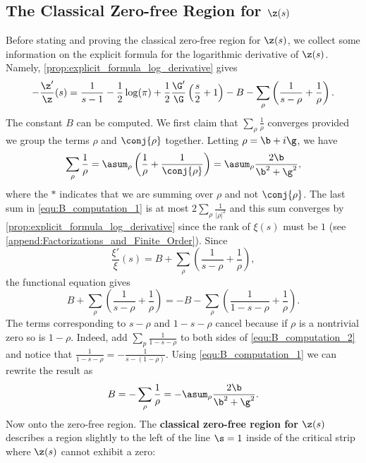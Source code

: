     \subsection*{The Classical Zero-free Region for \texorpdfstring{$\z(s)$}{\z(s)}}
      Before stating and proving the classical zero-free region for $\z(s)$, we collect some information on the explicit formula for the logarithmic derivative of $\z(s)$. Namely, \cref{prop:explicit_formula_log_derivative} gives
      \begin{equation}\label{equ:explicit_log_derivative_zeta}
        -\frac{\z'}{\z}(s) = \frac{1}{s-1}-\frac{1}{2}\log(\pi)+\frac{1}{2}\frac{\G'}{\G}\left(\frac{s}{2}+1\right)-B-\sum_{\rho}\left(\frac{1}{s-\rho}+\frac{1}{\rho}\right).
      \end{equation}
      The constant $B$ can be computed. We first claim that $\sum_{\rho}\frac{1}{\rho}$ converges provided we group the terms $\rho$ and $\conj{\rho}$ together. Letting $\rho = \b+i\g$, we have
      \begin{equation}\label{equ:B_computation_1}
        \sum_{\rho}\frac{1}{\rho} = \asum_{\rho}\left(\frac{1}{\rho}+\frac{1}{\conj{\rho}}\right) = \asum_{\rho}\frac{2\b}{\b^{2}+\g^{2}},
      \end{equation}
      where the $\ast$ indicates that we are summing over $\rho$ and not $\conj{\rho}$. The last sum in \cref{equ:B_computation_1} is at most $2\sum_{\rho}\frac{1}{|\rho|^{2}}$ and this sum converges by \cref{prop:explicit_formula_log_derivative} since the rank of $\xi(s)$ must be $1$ (see \cref{append:Factorizations_and_Finite_Order}). Since
      \[
        \frac{\xi'}{\xi}(s) = B+\sum_{\rho}\left(\frac{1}{s-\rho}+\frac{1}{\rho}\right),
      \]
      the functional equation gives
      \begin{equation}\label{equ:B_computation_2}
        B+\sum_{\rho}\left(\frac{1}{s-\rho}+\frac{1}{\rho}\right) = -B-\sum_{\rho}\left(\frac{1}{1-s-\rho}+\frac{1}{\rho}\right).
      \end{equation}
      The terms corresponding to $s-\rho$ and $1-s-\rho$ cancel because if $\rho$ is a nontrivial zero so is $1-\rho$. Indeed, add $\sum_{p}\frac{1}{1-s-\rho}$ to both sides of \cref{equ:B_computation_2} and notice that $\frac{1}{1-s-\rho} = -\frac{1}{s-(1-\rho)}$. Using \cref{equ:B_computation_1} we can rewrite the result as
      \[
        B = -\sum_{\rho}\frac{1}{\rho} = -\asum_{\rho}\frac{2\b}{\b^{2}+\g^{2}}.
      \]
       Now onto the zero-free region. The \textbf{classical zero-free region for $\z(s)$} describes a region slightly to the left of the line $\s = 1$ inside of the critical strip where $\z(s)$ cannot exhibit a zero:

